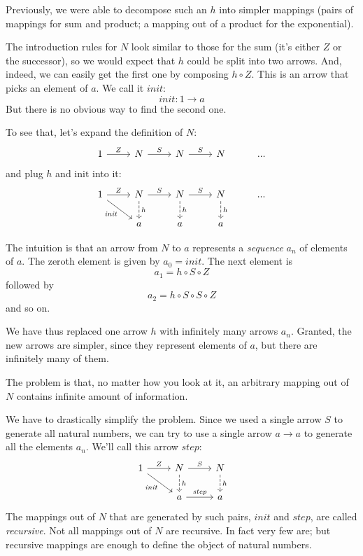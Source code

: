 \documentclass[DaoFP]{subfiles}
\begin{document}
Previously, we were able to decompose such an $h$ into simpler mappings (pairs of mappings for sum and product; a mapping out of a product for the exponential). 

The introduction rules for $N$ look similar to those for the sum (it's either $Z$ or the successor), so we would expect that $h$ could be split into two arrows. And, indeed, we can easily get the first one by composing $h \circ Z$. This is an arrow that picks an element of $a$. We call it $\mathit{init}$:
\[\mathit{init} \colon 1 \to a \]
But there is no obvious way to find the second one. 


To see that, let's expand the definition of $N$:
\[
 \begin{tikzcd}
 1
 \arrow[r, "Z"]
 &N
  \arrow[r, "S"]
&N
  \arrow[r, "S"]
&N
& ...
  \end{tikzcd}
\]
and plug $h$ and $\text{init}$ into it:
\[
 \begin{tikzcd}
 1
 \arrow[r, "Z"]
 \arrow[rd, "\mathit{init}"']
 &N
  \arrow[r, "S"]
\arrow[d, dashed, "h"]
&N
  \arrow[r, "S"]
\arrow[d, dashed, "h"]
&N
\arrow[d, dashed, "h"]
& ...
\\
& a
& a
& a
  \end{tikzcd}
\]

The intuition is that an arrow from $N$ to $a$ represents a \emph{sequence} $a_n$ of elements of $a$. The zeroth element is given by $a_0=\mathit{init}$. The next element is
\[a_1 = h \circ S \circ Z \]
followed by
\[a_2 = h \circ S \circ S \circ Z \]
and so on.

We have thus replaced one arrow $h$ with infinitely many arrows $a_n$. Granted, the new arrows are simpler, since they represent elements of $a$, but there are infinitely many of them. 

The problem is that, no matter how you look at it, an arbitrary mapping out of $N$ contains infinite amount of information.

We have to drastically simplify the problem. Since we used a single arrow $S$ to generate all natural numbers, we can try to use a single arrow $a \to a$ to generate all the elements $a_n$. We'll call this arrow $\mathit{step}$:
\[
 \begin{tikzcd}
 1
 \arrow[r, "Z"]
 \arrow[rd, "\mathit{init}"']
 &N
  \arrow[r, "S"]
\arrow[d, dashed, "h"]
&N
\arrow[d, dashed, "h"]
\\
& a
\arrow[r, "\mathit{step}"]
& a
  \end{tikzcd}
\]
The mappings out of $N$ that are generated by such pairs, $\mathit{init}$ and $\mathit{step}$, are called \emph{recursive}. Not all mappings out of $N$ are recursive. In fact very few are; but recursive mappings are enough to define the object of natural numbers. 
\end{document}

